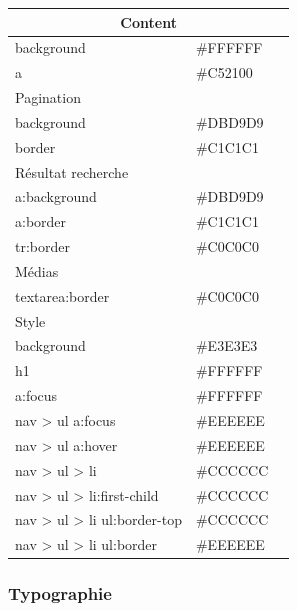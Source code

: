 \documentclass[letter, 10pt]{report}
\begin{document}
\begin{table}[h!]
\begin{center}
\begin{tabular}{|l|l|l|}
		\multicolumn{3}{|c|}{Content} \\ \hline
		background 					& \#FFFFFF & \cellcolor[HTML]{FFFFFF} \\ \hline
		a							& \#C52100 & \cellcolor[HTML]{C52100} \\ \hline
		\multicolumn{3}{|l|}{Pagination} \\ \hline
		background 					& \#DBD9D9 & \cellcolor[HTML]{DBD9D9} \\ \hline
		border 	   					& \#C1C1C1 & \cellcolor[HTML]{C1C1C1} \\ \hline
		\multicolumn{3}{|l|}{Résultat recherche} \\ \hline
		a:background 				& \#DBD9D9 & \cellcolor[HTML]{DBD9D9} \\ \hline
		a:border   					& \#C1C1C1 & \cellcolor[HTML]{C1C1C1} \\ \hline
		tr:border  					& \#C0C0C0 & \cellcolor[HTML]{C0C0C0} \\ \hline
		\multicolumn{3}{|l|}{Médias} \\ \hline
		textarea:border 			& \#C0C0C0 & \cellcolor[HTML]{C0C0C0} \\ \hline
		\multicolumn{3}{|l|}{Style} \\ \hline
		background 					& \#E3E3E3 & \cellcolor[HTML]{E3E3E3} \\ \hline
		h1 							& \#FFFFFF & \cellcolor[HTML]{FFFFFF} \\ \hline
		a:focus 					& \#FFFFFF & \cellcolor[HTML]{FFFFFF} \\ \hline
		nav > ul a:focus 			& \#EEEEEE & \cellcolor[HTML]{EEEEEE} \\ \hline
		nav > ul a:hover 			& \#EEEEEE & \cellcolor[HTML]{EEEEEE} \\ \hline
		nav > ul > li 				& \#CCCCCC & \cellcolor[HTML]{CCCCCC} \\ \hline
		nav > ul > li:first-child 	& \#CCCCCC & \cellcolor[HTML]{CCCCCC} \\ \hline
		nav > ul > li ul:border-top & \#CCCCCC & \cellcolor[HTML]{CCCCCC} \\ \hline
		nav > ul > li ul:border 	& \#EEEEEE & \cellcolor[HTML]{EEEEEE} \\ \hline
		\end{tabular}
	\end{center}
\end{table}

\subsubsection{Typographie}
\end{document}
